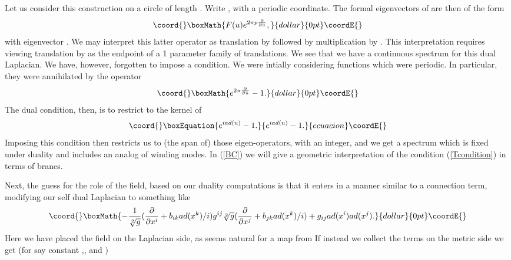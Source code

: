 \documentclass[a4paper,11pt]{amsart}
\begin{document}
Let us consider this construction on a circle of length \coordHE{}.  Write 
\coordHE{}, with \coordHE{} a \myHighlight{$2\pi$}\coordHE{} periodic coordinate.  
The formal eigenvectors of \coordHE{} are then 
of the form 
$$\coord{}\boxMath{F(u)e^{2\pi p\frac{\partial}{\partial u}},}{dollar}{0pt}\coordE{}$$
with eigenvector \coordHE{}. 
We may interpret this latter operator as translation by \coordHE{} followed by
multiplication by \coordHE{}. This interpretation requires viewing translation by
\coordHE{} as the endpoint of a 1 parameter family of translations. We see that we have a
continuous spectrum for this dual Laplacian. We have, however, forgotten to
 impose a condition. We were intially considering functions which were
 \myHighlight{$2\pi$}\coordHE{} periodic. In particular, they were annihilated by the operator 
 $$\coord{}\boxMath{e^{2\pi\frac{\partial}{\partial u}} - 1.}{dollar}{0pt}\coordE{}$$
 The \coordHE{} dual condition, then, is to restrict to the kernel of 
 \begin{equation}\coord{}\boxEquation{\label{Tcondition}
 e^{i ad(u)} - 1.
 }{e^{i ad(u)} - 1.
 }{ecuacion}\coordE{}\end{equation}
  Imposing this condition then restricts us to (the span of) 
  those eigen-operators, \coordHE{}
   with \coordHE{} an integer, 
  and we get a spectrum which is fixed under \coordHE{} duality and includes an analog
  of winding modes. 
   In (\ref{BC}) we will give a geometric interpretation of the condition
   (\ref{Tcondition}) in terms of \coordHE{} branes.
   
   
 Next, the guess for the role of the \coordHE{} field, based on our \coordHE{} duality
computations is that it enters in a manner similar to a connection term,
 modifying our self dual Laplacian to something
like
$$\coord{}\boxMath{-\frac{1}{\sqrt[2]{g}}(\frac{\partial}{\partial x^i} + b_{ik}ad(x^k)/i)g^{ij}\sqrt[2]{g}
(\frac{\partial}{\partial x^j}+b_{jk}ad(x^k)/i)
+ g_{ij}ad(x^i)ad(x^j).}{dollar}{0pt}\coordE{}$$ 
Here we have placed the \coordHE{} field on the Laplacian side, as seems natural for 
a map from \coordHE{} If instead we collect the \coordHE{} terms on the 
metric side we get (for say constant \coordHE{},\coordHE{}, and \coordHE{})
\end{document}
